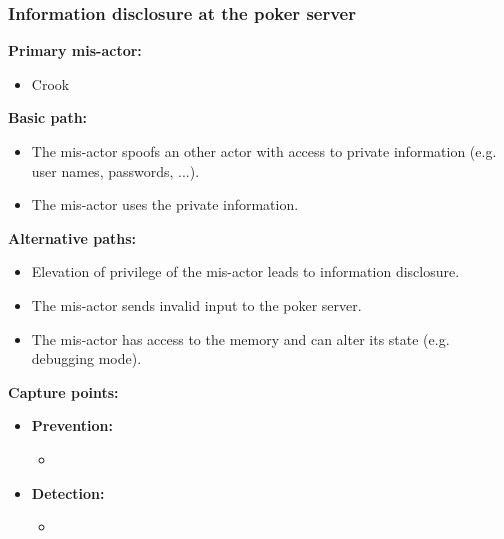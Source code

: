 \documentclass[a4paper,11pt]{report}
\begin{document}
\subsubsection{Information disclosure at the poker server}
\textbf{Primary mis-actor:}
\begin{itemize}
\item Crook
\end{itemize}
\textbf{Basic path:}
\begin{itemize}
\item The mis-actor spoofs an other actor with access to private information (e.g. user names, passwords, ...).
\item The mis-actor uses the private information.
\end{itemize}
\textbf{Alternative paths:}
\begin{itemize}
\item Elevation of privilege of the mis-actor leads to information disclosure.
\item The mis-actor sends invalid input to the poker server.
\item The mis-actor has access to the memory and can alter its state (e.g. debugging mode).
\end{itemize}
\textbf{Capture points:}
\begin{itemize}
\item \textbf{Prevention:}
\begin{itemize}
\item 
\end{itemize}
\item \textbf{Detection:}
\begin{itemize}
\item 
\end{itemize}
\end{itemize}
\end{document}
